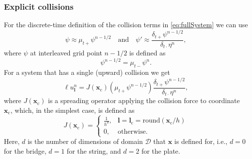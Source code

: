 \documentclass[dvipsnames, pdftex]{article}
\begin{document}
\subsubsection{Explicit collisions}
For the discrete-time definition of the collision terms in \eqref{eq:fullSystem} we can use 
\begin{equation}
    \psi\approx \mu_{t+}\psi^{n-1/2}\quad \text{and} \quad \psi' \approx \frac{\delta_{t+}\psi^{n-1/2}}{\delta_{t\cdot}\eta^n},
\end{equation}
where $\psi$ at interleaved grid point $n-1/2$ is defined as
\begin{equation}
    \psi^{n-1/2} = \mu_{t-}\psi^n.
\end{equation}
For a system that has a single (upward) collision we get
\begin{equation}\label{eq:dummySystem}
    \ell u^n_{\boldsymbol{l}} = J(\boldsymbol{x}_\text{c})\left(\mu_{t+}\psi^{n-1/2}\right)\frac{\delta_{t+}\psi^{n-1/2}}{\delta_{t\cdot}\eta^n},
\end{equation}
where $J(\boldsymbol{x}_\text{c})$ is a spreading operator applying the collision force to coordinate $\boldsymbol{x}_\text{c}$, which, in the simplest case, is defined as \cite{bilbao2009numerical}
\begin{equation}
   J(\boldsymbol{x}_\text{c}) = \begin{cases}
       \frac{1}{h^d}, & \boldsymbol{l} = \boldsymbol{l}_\text{c} = \text{round}(\boldsymbol{x}_\text{c} / h)\\
       0, & \text{otherwise}.
   \end{cases}
\end{equation}
Here, $d$ is the number of dimensions of domain $\mathcal{D}$ that $\boldsymbol{x}$ is defined for, i.e., $d=0$ for the bridge, $d=1$ for the string, and $d=2$ for the plate.
\end{document}
